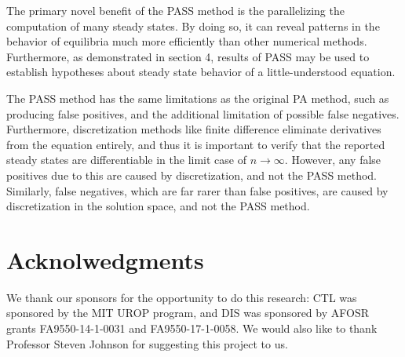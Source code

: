 \documentclass[11pt]{article}
\begin{document}
The primary novel benefit of the PASS method is the parallelizing the computation of many steady states. By doing so, it can reveal patterns in the behavior of equilibria much more efficiently than other numerical methods. Furthermore, as demonstrated in section 4, results of PASS may be used to establish hypotheses about steady state behavior of a little-understood equation.

The PASS method has the same limitations as the original PA method, such as producing false positives, and the additional limitation of possible false negatives. Furthermore, discretization methods like finite difference eliminate derivatives from the equation entirely, and thus it is important to verify that the reported steady states are differentiable in the limit case of $n \rightarrow \infty$. However, any false positives due to this are caused by discretization, and not the PASS method. Similarly, false negatives, which are far rarer than false positives, are caused by discretization in the solution space, and not the PASS method.

\section{Acknolwedgments}

\begin{comment}


I would like to thank my UROP advisor, Dr. David Spivak, for his guidance, encouragement, and insight in helping me understand and conduct independent research into the pixel array method. I would also like to thank Professor Steven Johnson for the inspiration for this project.

\end{comment}

We thank our sponsors for the opportunity to do this research: CTL was sponsored by the MIT UROP program, and DIS was sponsored by AFOSR grants FA9550-14-1-0031 and FA9550-17-1-0058. We would also like to thank Professor Steven Johnson for suggesting this project to us.
\end{document}

